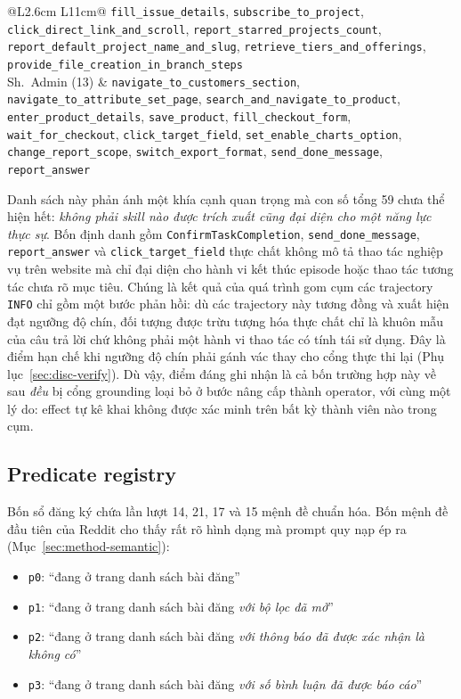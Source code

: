 \begin{table}[H]
\begin{tabular}{@{}L{2.6cm} L{11cm}@{}}
\texttt{fill\_issue\_details}, \texttt{subscribe\_to\_project},
\texttt{click\_direct\_link\_and\_scroll},
\texttt{report\_starred\_projects\_count},
\texttt{report\_default\_project\_name\_and\_slug},
\texttt{retrieve\_tiers\_and\_offerings},
\texttt{provide\_file\_creation\_in\_branch\_steps} \\
\addlinespace
Sh.\ Admin (13) & \texttt{navigate\_to\_customers\_section},
\texttt{navigate\_to\_attribute\_set\_page},
\texttt{search\_and\_navigate\_to\_product}, \texttt{enter\_product\_details},
\texttt{save\_product}, \texttt{fill\_checkout\_form},
\texttt{wait\_for\_checkout}, \texttt{click\_target\_field},
\texttt{set\_enable\_charts\_option}, \texttt{change\_report\_scope},
\texttt{switch\_export\_format}, \texttt{send\_done\_message},
\texttt{report\_answer} \\
\bottomrule
\end{tabular}
\end{table}

\noindent
Danh sách này phản ánh một khía cạnh quan trọng mà con số tổng 59 chưa thể
hiện hết: \emph{không phải skill nào được trích xuất cũng đại diện cho một năng
lực thực sự}. Bốn định danh gồm \texttt{ConfirmTaskCompletion},
\texttt{send\_done\_message}, \texttt{report\_answer} và
\texttt{click\_target\_field} thực chất không mô tả thao tác nghiệp vụ trên
website mà chỉ đại diện cho hành vi kết thúc episode hoặc thao tác tương tác
chưa rõ mục tiêu. Chúng là kết quả của quá trình gom cụm các trajectory
\texttt{INFO} chỉ gồm một bước phản hồi: dù các trajectory này tương đồng và
xuất hiện đạt ngưỡng độ chín, đối tượng được trừu tượng
hóa thực chất chỉ là khuôn mẫu của câu trả lời chứ không phải một hành vi thao
tác có tính tái sử dụng. Đây là điểm hạn chế khi ngưỡng độ chín phải gánh vác
thay cho cổng thực thi lại (Phụ lục~\ref{sec:disc-verify}). Dù vậy, điểm đáng ghi
nhận là cả bốn trường hợp này về sau \emph{đều} bị cổng grounding loại bỏ ở bước
nâng cấp thành operator, với cùng một lý do: effect tự kê khai không được xác
minh trên bất kỳ thành viên nào trong cụm.

\subsection*{Predicate registry}

Bốn sổ đăng ký chứa lần lượt 14, 21, 17 và 15 mệnh đề chuẩn hóa. Bốn mệnh đề
đầu tiên của Reddit cho thấy rất rõ hình dạng mà prompt quy nạp ép ra
(Mục~\ref{sec:method-semantic}):

\begin{itemize}
  \item \texttt{p0}: ``đang ở trang danh sách bài đăng''
  \item \texttt{p1}: ``đang ở trang danh sách bài đăng \emph{với bộ lọc đã mở}''
  \item \texttt{p2}: ``đang ở trang danh sách bài đăng \emph{với thông báo đã
  được xác nhận là không có}''
  \item \texttt{p3}: ``đang ở trang danh sách bài đăng \emph{với số bình luận
  đã được báo cáo}''
\end{itemize}

